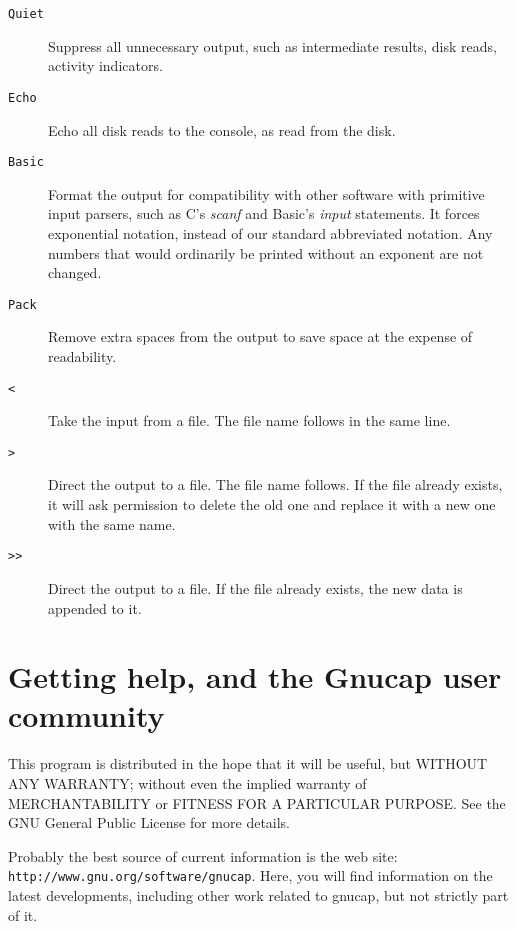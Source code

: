 \begin{description}

\item[{\tt Quiet}] Suppress all unnecessary output, such as intermediate
results, disk reads, activity indicators.

\item[{\tt Echo}] Echo all disk reads to the console, as read from the disk.

\item[{\tt Basic}] Format the output for compatibility with other software
with primitive input parsers, such as C's {\em scanf} and Basic's {\em input}
statements.  It forces exponential notation, instead of our standard
abbreviated notation.  Any numbers that would ordinarily be printed without
an exponent are not changed.

\item[{\tt Pack}] Remove extra spaces from the output to save space at the 
expense of readability.

\item[{\tt <}] Take the input from a file.  The file name follows in the
same line.

\item[{\tt >}] Direct the output to a file.  The file name follows.  If the
file already exists, it will ask permission to delete the old one and
replace it with a new one with the same name.

\item[{\tt >>}] Direct the output to a file.  If the file already exists,
the new data is appended to it.  

\end{description}
\section{Getting help, and the Gnucap user community}

This program is distributed in the hope that it will be useful, but WITHOUT
ANY WARRANTY; without even the implied warranty of MERCHANTABILITY or
FITNESS FOR A PARTICULAR PURPOSE.  See the GNU General Public License for
more details.

Probably the best source of current information is the web site: {\tt
http://www.gnu.org/software/gnucap}.  Here, you will find information
on the latest developments, including other work related to gnucap,
but not strictly part of it.

